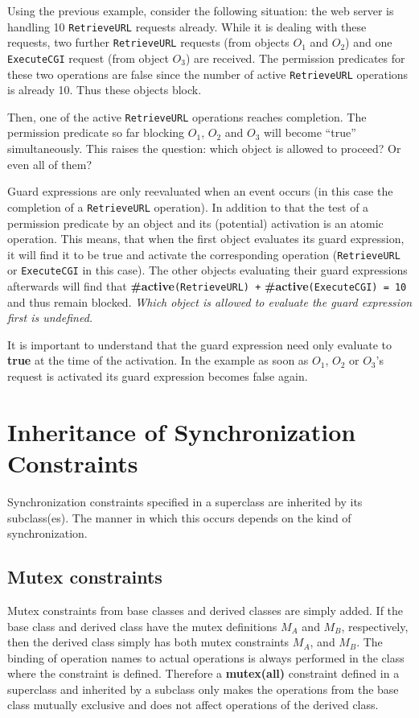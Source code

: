\documentclass{overturerepchap}
\newcommand{\keyw}[1]{{\bf\ttfamily #1}}
\begin{document}
Using the previous example, consider the following situation: the web
server is handling 10 \texttt{RetrieveURL} requests already. While it
is dealing with these requests, two further \texttt{RetrieveURL}
requests (from objects $O_1$ and $O_2$) and one \texttt{ExecuteCGI}
request (from object $O_3$) are received. The permission predicates
for these two operations are false since the number of active
\texttt{RetrieveURL} operations is already 10. Thus these objects
block. 

Then, one of the active \texttt{RetrieveURL} operations reaches
completion. The permission predicate so far blocking $O_1$, $O_2$ and
$O_3$ will become ``true'' simultaneously.
This raises the question: which object is allowed to proceed? Or even
all of them? 

Guard expressions are only reevaluated when an event occurs (in this
case the completion of a \texttt{RetrieveURL} operation). In addition to
that the test of a permission predicate by an object and its (potential)
activation is an atomic operation. This means, that when the first
object evaluates its guard expression, it will find it to be true and
activate the corresponding operation (\texttt{RetrieveURL} or
\texttt{ExecuteCGI} in this case). The other objects evaluating their
guard expressions afterwards will find that 
\keyw{\#active}{\tt (RetrieveURL) +} \keyw{\#active}{\tt (ExecuteCGI) = 10}
and thus remain blocked. \textit{Which object is allowed to evaluate the guard
expression first is undefined.}

It is important to understand that the guard expression need only 
evaluate to \keyw{true} at the time of the activation. In the
example as soon as $O_1$, $O_2$ or $O_3$'s request is activated its
guard expression becomes false again. 


\section{Inheritance of Synchronization Constraints}
\label{ch:sync-inh}

Synchronization constraints specified in a superclass are inherited by
its subclass(es). 
The manner in which this occurs depends on 
the kind of synchronization.

\subsection{Mutex constraints}
Mutex constraints from base classes and derived classes are
simply added. If the base class and derived class have the mutex
definitions {$M_{A}$} and {$M_{B}$}, respectively, then the derived
class simply has both mutex constraints {$M_{A}$}, and
{$M_{B}$}. The binding of operation names to actual operations is
always performed in the class where the constraint is
defined. Therefore a \keyw{mutex(all)} constraint defined in a
superclass and inherited by a subclass only makes the operations from
the base class mutually exclusive and does not affect operations of
the derived class.
\end{document}
